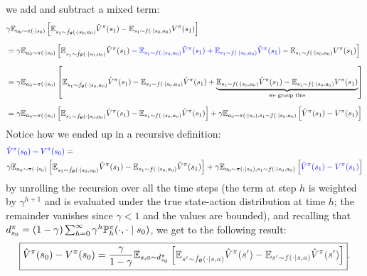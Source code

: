 \documentclass[10pt, a4paper]{report}
\begin{document}
we add and subtract a mixed term:\begin{align}
    &{\gamma{\mathbb E}_{a_0\sim\pi(\cdot\mid s_0)}}\left[
        {\mathbb E}_{s_1\sim\hat f_{\boldsymbol{\theta}}(\cdot\mid s_0,a_0)}\hat V^\pi(s_1)-
        {\mathbb E}_{s_1\sim f(\cdot\mid s_0,a_0)} V^\pi(s_1)
     \right]\\[1.5ex]
     &={\gamma{\mathbb E}_{a_0\sim\pi(\cdot\mid s_0)}}\left[
        {\mathbb E}_{s_1\sim\hat f_{\boldsymbol{\theta}}(\cdot\mid s_0,a_0)}\hat V^\pi(s_1)
        \color{blue}-{\mathbb E}_{s_1\sim f(\cdot\mid s_0,a_0)}\hat V^\pi(s_1)
        +{\mathbb E}_{s_1\sim f(\cdot\mid s_0,a_0)}\hat V^\pi(s_1)\color{black}-
        {\mathbb E}_{s_1\sim f(\cdot\mid s_0,a_0)} V^\pi(s_1)
     \right]\\[1.5ex]
     &={\gamma{\mathbb E}_{a_0\sim\pi(\cdot\mid s_0)}}\left[
        {\mathbb E}_{s_1\sim\hat f_{\boldsymbol{\theta}}(\cdot\mid s_0,a_0)}\hat V^\pi(s_1)
        -{\mathbb E}_{s_1\sim f(\cdot\mid s_0,a_0)}\hat V^\pi(s_1)
        +\underbrace{{{\mathbb E}_{s_1\sim f(\cdot\mid s_0,a_0)}\hat V^\pi(s_1)}-
        {\mathbb E}_{s_1\sim f(\cdot\mid s_0,a_0)} V^\pi(s_1)}_{\text{we group this}}
     \right]\\[1.5ex]
     &=\gamma{\mathbb E}_{a_0\sim\pi(\cdot\mid s_0)}\left[
        {\mathbb E}_{s_1\sim \hat f_{\boldsymbol{\theta}}(\cdot\mid s_0,a_0)}\hat V^\pi(s_1)-
        {\mathbb E}_{s_1\sim  f(\cdot\mid s_0,a_0)}\hat V^\pi(s_1)
     \right]+
     \gamma{\mathbb E}_{a_0\sim\pi(\cdot\mid s_0), s_1\sim f(\cdot\mid s_0,a_0)}\left[
        \hat V^\pi(s_1)-V^\pi(s_1)
     \right]
\end{align}
Notice how we ended up in a recursive definition:\begin{align}
    &\color{blue}\hat V^\pi(s_0)-  V^\pi(s_0)\color{black}=\\ &\gamma{\mathbb E}_{a_0\sim\pi(\cdot\mid s_0)}\left[
        {\mathbb E}_{s_1\sim \hat f_{\boldsymbol{\theta}}(\cdot\mid s_0,a_0)}\hat V^\pi(s_1)-
        {\mathbb E}_{s_1\sim  f(\cdot\mid s_0,a_0)}\hat V^\pi(s_1)
     \right]+
     \gamma{\mathbb E}_{a_0\sim\pi(\cdot\mid s_0), s_1\sim f(\cdot\mid s_0,a_0)}\left[
        \color{blue}\hat V^\pi(s_1)-V^\pi(s_1)\color{black}
     \right]
\end{align}
by unrolling the recursion over all the time steps (the term at step $h$ is weighted by $\gamma^{h+1}$ and is evaluated under the true state-action distribution at time $h$; the remainder vanishes since $\gamma<1$ and the values are bounded), and recalling that $d_{s_0}^\pi=(1-\gamma)\sum_{h=0}^\infty\gamma^h{\mathbb P}^\pi_h(\cdot,\cdot\mid s_0)$, we get to the following result:\begin{equation}\label{eq:sim_diff}
    \boxed{
        \hat V^\pi(s_0)-  V^\pi(s_0)=\frac{\gamma}{1-\gamma}
        \VA_{s,a\sim d_{s_0}^\pi}\left[
            \grayText{\VA_{s'\sim \hat f_\btheta(\cdot\mid s,a)}\hat V^\pi(s')-
            \VA_{s'\sim  f(\cdot\mid s,a)} \hat V^\pi(s')}
        \right]
    }.
\end{equation}
\end{document}
